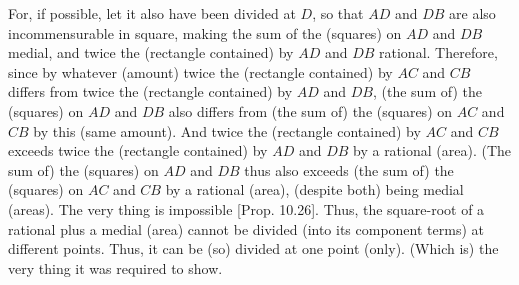 \begin{Parallel}{}{}
{For, if possible, let it also have been divided at $D$, so that
$AD$ and $DB$ are also incommensurable in square, making the sum of 
the (squares) on $AD$ and $DB$ medial, and twice the (rectangle
contained) by $AD$ and $DB$ rational. Therefore, since by whatever
(amount) twice the (rectangle contained) by $AC$ and $CB$
differs from twice the (rectangle contained) by $AD$ and $DB$, (the sum of) the (squares) on  $AD$ and $DB$ also differs from (the sum of) the
(squares) on
$AC$ and $CB$ by this
(same amount). And twice the (rectangle contained) by $AC$ and $CB$
exceeds twice the (rectangle contained) by $AD$ and $DB$ by a
rational (area). (The sum of) the (squares)
on $AD$ and $DB$ thus also exceeds (the sum of) the (squares) on $AC$ and $CB$ by a rational (area),
(despite both) being medial (areas). The very thing is impossible [Prop. 10.26]. Thus, the square-root of a rational
plus a medial (area) cannot be divided (into its component terms) at different points. Thus, it
can  be (so) divided at one point (only). (Which is) the very thing it was required to
show.}
\end{Parallel}



